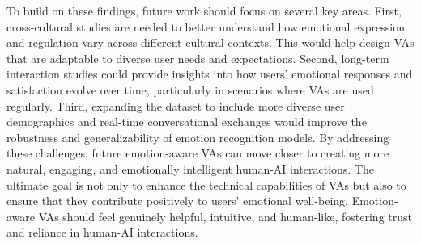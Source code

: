To build on these findings, future work should focus on several key areas. First, cross-cultural studies are needed to better understand how emotional expression and regulation vary across different cultural contexts. This would help design VAs that are adaptable to diverse user needs and expectations. Second, long-term interaction studies could provide insights into how users' emotional responses and satisfaction evolve over time, particularly in scenarios where VAs are used regularly. Third, expanding the dataset to include more diverse user demographics and real-time conversational exchanges would improve the robustness and generalizability of emotion recognition models.
By addressing these challenges, future emotion-aware VAs can move closer to creating more natural, engaging, and emotionally intelligent human-AI interactions. The ultimate goal is not only to enhance the technical capabilities of VAs but also to ensure that they contribute positively to users' emotional well-being. Emotion-aware VAs should feel genuinely helpful, intuitive, and human-like, fostering trust and reliance in human-AI interactions.
